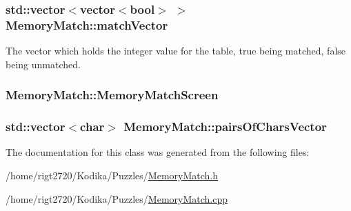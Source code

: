 \hypertarget{classMemoryMatch_ac42fc8b5ac8b04bd0651222fa31d2251}{
\subsubsection[{match\-Vector}]{\setlength{\rightskip}{0pt plus 5cm}std\-::vector$<$vector$<$bool$>$ $>$ Memory\-Match\-::match\-Vector\hspace{0.3cm}{\ttfamily [private]}}}\label{classMemoryMatch_ac42fc8b5ac8b04bd0651222fa31d2251}
The vector which holds the integer value for the table, true being matched, false being unmatched. \hypertarget{classMemoryMatch_a78399975fec5fea7b2102449a4536fcd}{
\subsubsection[{Memory\-Match\-Screen}]{ Memory\-Match\-::\-Memory\-Match\-Screen\hspace{0.3cm}{\ttfamily [private]}}}\label{classMemoryMatch_a78399975fec5fea7b2102449a4536fcd}
\hypertarget{classMemoryMatch_a80336b0b989152fed590a6fa755197bc}{
\subsubsection[{pairs\-Of\-Chars\-Vector}]{\setlength{\rightskip}{0pt plus 5cm}std\-::vector$<$char$>$ Memory\-Match\-::pairs\-Of\-Chars\-Vector\hspace{0.3cm}{\ttfamily [private]}}}\label{classMemoryMatch_a80336b0b989152fed590a6fa755197bc}


The documentation for this class was generated from the following files\-:\begin{DoxyCompactItemize}
\item 
/home/rigt2720/\-Kodika/\-Puzzles/\hyperlink{MemoryMatch_8h}{Memory\-Match.\-h}\item 
/home/rigt2720/\-Kodika/\-Puzzles/\hyperlink{MemoryMatch_8cpp}{Memory\-Match.\-cpp}\end{DoxyCompactItemize}
